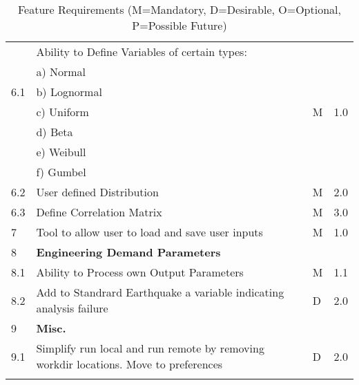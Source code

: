 {\begin{longtable}{| p{} | p{} | p{} | p{} |}
	\multirow{5}{*}{6.1} & Ability to Define Variables of certain types: &  &  \\ 
	 & a)     Normal &  &  \\ 
	 & b)     Lognormal &  &  \\ 
	 & c)     Uniform & M  & 1.0 \\ 
	 & d)     Beta &  &  \\ 
	 & e)     Weibull &  &  \\ 
	 & f)     Gumbel &  &  \\ \hline
	6.2 & User defined Distribution & M & 2.0 \\ \hline
	6.3 & Define Correlation Matrix & M & 3.0 \\ \hline
	7 & Tool to allow user to load and save user inputs & M & 1.0 \\ \hline
	8 & \textbf{Engineering Demand Parameters} &  &  \\ \hline
	8.1 & Ability to Process own Output Parameters & M & 1.1  \\ \hline
	8.2 & Add to Standrard Earthquake a variable indicating analysis failure & D & 2.0  \\ \hline
    9 & \textbf{Misc.} &  &  \\ \hline
	9.1 & Simplify run local and run remote by removing workdir locations. Move to preferences & D & 2.0  \\ \hline
	\bottomrule 
\caption{Feature Requirements (M=Mandatory, D=Desirable, O=Optional, P=Possible Future)}             
  \label{tab:featureRequirements}                 
\end{longtable}
}